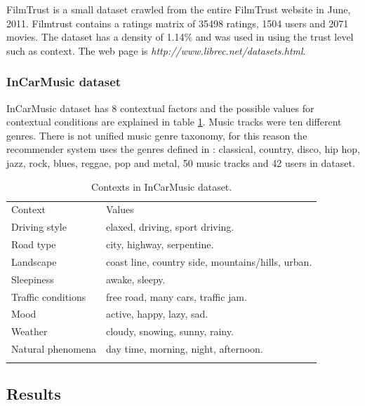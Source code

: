 FilmTrust is a small dataset crawled from the entire FilmTrust website
in June, 2011. Filmtrust contains a ratings matrix of 35498 ratings,
1504  users and 2071 movies. The dataset has a density of 1.14\% and
was used in \cite{guo2013novel} using the trust level such as
context. The web page is \textit{http://www.librec.net/datasets.html}.

\subsubsection{InCarMusic dataset}

InCarMusic dataset\cite{baltrunas2011incarmusic} has 8 
contextual factors and the possible values for contextual conditions 
are explained in table \ref{tab:incarmusic}.
Music tracks were ten different genres. There is not unified music
genre taxonomy, for this reason the recommender system uses the genres
defined in \cite{tzanetakis2002musical}: classical, country, disco, 
hip hop,  jazz, rock, blues, reggae, pop and metal, 50 music tracks 
and 42 users in dataset.
\begin{table}
\centering
\small
\caption{Contexts in InCarMusic dataset.}
\label{tab:incarmusic}   
\begin{tabular}{ll}
\hline\noalign{\smallskip}
Context  			& Values \\
\noalign{\smallskip}\hline\noalign{\smallskip}
Driving style 		&  elaxed, driving, sport driving.   \\
Road type 			&  city, highway, serpentine. \\
Landscape 			& coast line, country side, mountains/hills, urban.\\
Sleepiness 			& awake, sleepy. \\
Traffic conditions 	& free road, many cars, traffic jam. \\
Mood 				& active, happy, lazy, sad. \\
Weather 			& cloudy, snowing, sunny, rainy. \\
Natural phenomena 	& day time, morning, night, afternoon. \\
\noalign{\smallskip}\hline
\end{tabular}
\end{table}

\subsection{Results} 

